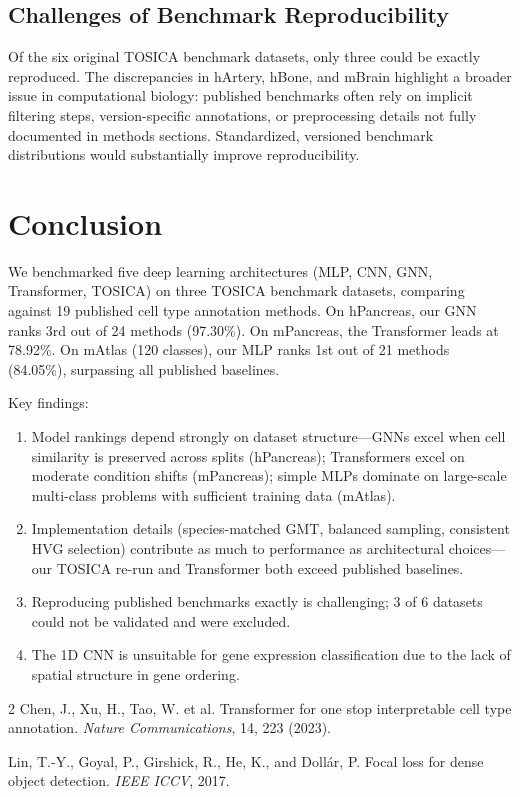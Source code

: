 \documentclass[11pt,letterpaper]{article}
\begin{document}
\subsection{Challenges of Benchmark Reproducibility}
Of the six original TOSICA benchmark datasets, only three could be exactly
reproduced. The discrepancies in hArtery, hBone, and mBrain highlight a broader
issue in computational biology: published benchmarks often rely on implicit
filtering steps, version-specific annotations, or preprocessing details not
fully documented in methods sections. Standardized, versioned benchmark
distributions would substantially improve reproducibility.

\section{Conclusion}

We benchmarked five deep learning architectures (MLP, CNN, GNN, Transformer,
TOSICA) on three TOSICA benchmark datasets, comparing against 19 published cell
type annotation methods. On hPancreas, our GNN ranks 3rd out of 24 methods
(97.30\%). On mPancreas, the Transformer leads at 78.92\%. On mAtlas (120
classes), our MLP ranks 1st out of 21 methods (84.05\%), surpassing all
published baselines.

Key findings:
\begin{enumerate}
    \item Model rankings depend strongly on dataset structure---GNNs excel
    when cell similarity is preserved across splits (hPancreas); Transformers
    excel on moderate condition shifts (mPancreas); simple MLPs dominate on
    large-scale multi-class problems with sufficient training data (mAtlas).
    \item Implementation details (species-matched GMT, balanced sampling,
    consistent HVG selection) contribute as much to performance as architectural
    choices---our TOSICA re-run and Transformer both exceed published baselines.
    \item Reproducing published benchmarks exactly is challenging; 3 of 6
    datasets could not be validated and were excluded.
    \item The 1D CNN is unsuitable for gene expression classification due to
    the lack of spatial structure in gene ordering.
\end{enumerate}


\begin{thebibliography}{2}
Chen, J., Xu, H., Tao, W. et al.
\newblock Transformer for one stop interpretable cell type annotation.
\newblock \emph{Nature Communications}, 14, 223 (2023).

Lin, T.-Y., Goyal, P., Girshick, R., He, K., and Doll\'{a}r, P.
\newblock Focal loss for dense object detection.
\newblock \emph{IEEE ICCV}, 2017.
\end{thebibliography}
\end{document}
